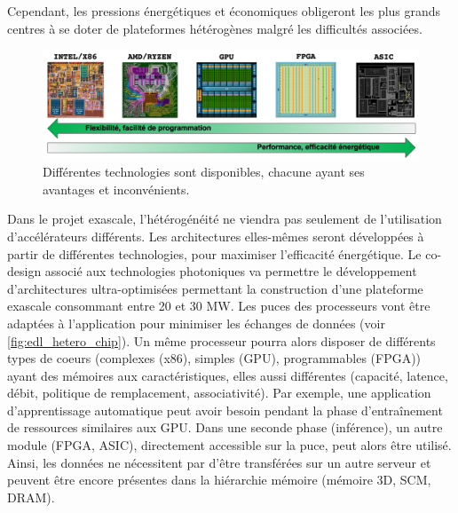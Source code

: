         Cependant, les pressions énergétiques et économiques obligeront les plus grands centres à se doter de plateformes hétérogènes malgré les difficultés associées. 
        
        \begin{figure}
        \center
        \includegraphics[width=17cm]{images/edl_many_techno.png}
        \caption{\label{fig:edl_many_techno} Différentes technologies sont disponibles, chacune ayant ses avantages et inconvénients.}
        \end{figure}
            
        Dans le projet \gls{exascale}, l'hétérogénéité ne viendra pas seulement de l'utilisation d'accélérateurs différents. Les architectures elles-mêmes seront développées à partir de différentes technologies, pour maximiser l'efficacité énergétique. Le co-design associé aux technologies photoniques va permettre le développement d'architectures ultra-optimisées permettant la construction d'une plateforme \gls{exascale} consommant entre 20 et 30 MW. Les puces des processeurs vont être adaptées à l'application pour minimiser les échanges de données (voir \autoref{fig:edl_hetero_chip}). Un même processeur pourra alors disposer de différents types de coeurs (complexes (x86), simples (GPU), programmables (FPGA)) ayant des mémoires aux caractéristiques, elles aussi différentes (capacité, latence, débit, politique de remplacement, associativité).  Par exemple, une application d'apprentissage automatique peut avoir besoin pendant la phase d'entraînement de ressources similaires aux GPU. Dans une seconde phase (inférence), un autre module (FPGA, ASIC), directement accessible sur la puce, peut alors être utilisé. Ainsi, les données ne nécessitent par d’être transférées sur un autre serveur et peuvent être encore présentes dans la hiérarchie mémoire (mémoire 3D, SCM, DRAM).
        
